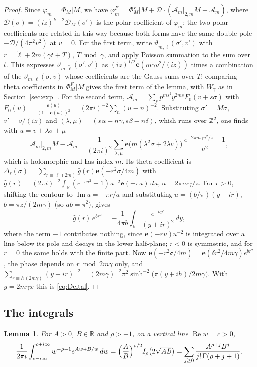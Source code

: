 \documentclass[11pt]{amsart}
\numberwithin{equation}{section}
\theoremstyle{plain}
\newtheorem{lem}[thm]{Lemma}
\theoremstyle{definition}
\theoremstyle{remark}
\newcommand{\Z}{\mathbb{Z}}
\newcommand{\R}{\mathbb{R}}
\newcommand{\cA}{\mathcal{A}}
\newcommand{\e}{\mathbf{e}}
\begin{document}
\begin{proof}
Since $\varphi_m=\Phi_M|M$, we have $\varphi^F_m=\Phi^F_M|M+\mathcal D\cdot(\cA_m|_{2,m}M-\cA_m)$, where $\mathcal D(\sigma)=(iz)^{k+2}\mathcal D_M(\sigma')$ is the polar coefficient of $\varphi_m$; the two polar coefficients are related in this way because both forms have the same double pole $-\mathcal D/(4\pi^2v^2)$ at $v=0$. For the first term, write $\vartheta_{m,\tilde\ell}(\sigma',v')$ with $r=\tilde\ell+2m(\gamma t+T)$, $T\bmod\gamma$, and apply Poisson summation to the sum over $t$. This expresses $\vartheta_{m,\tilde\ell}(\sigma',v')$ as $(iz)^{1/2}\e(m\gamma v^2/(iz))$ times a combination of the $\vartheta_{m,\ell}(\sigma,v)$ whose coefficients are the Gauss sums over $T$; comparing theta coefficients in $\Phi^F_M|M$ gives the first term of the lemma, with $W_\gamma$ as in Section~\ref{sec:exp} \cite[\S5]{EZ85}. For the second term, $\cA_m=\sum_sp^{ms^2}y^{2ms}F_0(v+s\sigma)$ with $F_0(u)=\frac{\e(u)}{(1-\e(u))^2}=(2\pi i)^{-2}\sum_n(u-n)^{-2}$. Substituting $\sigma'=M\sigma$, $v'=v/(iz)$ and $(\lambda,\mu)=(s\alpha-n\gamma,s\beta-n\delta)$, which runs over $\Z^2$, one finds with $u=v+\lambda\sigma+\mu$
\[
\cA_m|_{2,m}M-\cA_m=\frac{1}{(2\pi i)^2}\sum_{\lambda,\mu}\e\bigl(m(\lambda^2\sigma+2\lambda v)\bigr)\,\frac{e^{-2\pi m\gamma u^2/z}-1}{u^2},
\]
which is holomorphic and has index $m$. Its theta coefficient is $\Delta_\ell(\sigma)=\sum_{r\equiv\ell\,(2m)}\hat g(r)\e(-r^2\sigma/4m)$ with $\hat g(r)=(2\pi i)^{-2}\int_\R(e^{-au^2}-1)u^{-2}\e(-ru)\,du$, $a=2\pi m\gamma/z$. For $r>0$, shifting the contour to $\operatorname{Im}u=-\pi r/a$ and substituting $u=(b/\pi)(y-ir)$, $b=\pi z/(2m\gamma)$ (so $ab=\pi^2$), gives
\[
\hat g(r)\,e^{br^2}=-\frac{1}{4\pi b}\int_\R\frac{e^{-by^2}}{(y+ir)^2}\,dy,
\]
where the term $-1$ contributes nothing, since $\e(-ru)u^{-2}$ is integrated over a line below its pole and decays in the lower half-plane; $r<0$ is symmetric, and for $r=0$ the same holds with the finite part. Now $\e(-r^2\sigma/4m)=\e(\delta r^2/4m\gamma)e^{br^2}$, the phase depends on $r\bmod2m\gamma$ only, and $\sum_{r\equiv h\,(2m\gamma)}(y+ir)^{-2}=(2m\gamma)^{-2}\pi^2\sinh^{-2}\bigl(\pi(y+ih)/2m\gamma\bigr)$. With $y=2m\gamma x$ this is \eqref{eq:Deltal}.
\end{proof}

\subsection{The integrals}
\begin{lem}\label{lem:besselint}
For $A>0$, $B\in\R$ and $\rho>-1$, on a vertical line $\operatorname{Re}w=c>0$,
\[
\frac{1}{2\pi i}\int_{c-i\infty}^{c+i\infty}w^{-\rho-1}e^{Aw+B/w}\,dw=\Bigl(\frac AB\Bigr)^{\rho/2}I_\rho\bigl(2\sqrt{AB}\bigr)=\sum_{j\ge0}\frac{A^{\rho+j}B^j}{j!\,\Gamma(\rho+j+1)} .
\]
\end{lem}
\end{document}
